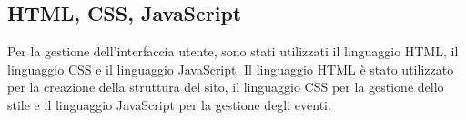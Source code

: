 \subsection{HTML, CSS, JavaScript}\label{sec:cap_sec_subsec}
Per la gestione dell'interfaccia utente, sono stati utilizzati il linguaggio HTML, il 
linguaggio CSS e il linguaggio JavaScript. Il linguaggio HTML è stato utilizzato per la 
creazione della struttura del sito, il linguaggio CSS per la gestione dello stile e il 
linguaggio JavaScript per la gestione degli eventi.